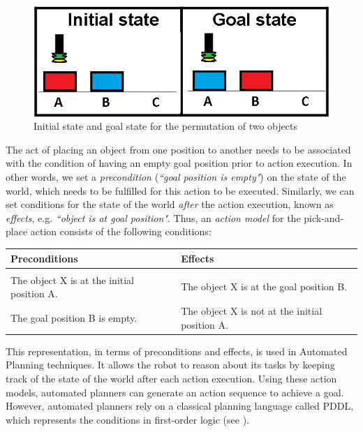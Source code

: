 \begin{figure}[h]
	\centering
	\includegraphics[scale=0.35]{figures/PbD-permutation}
	\caption{Initial state and goal state for the permutation of two objects}
	\label{fig:Permutation}
\end{figure}

The act of placing an object from one position to another needs to be associated with the condition of having an empty goal position prior to action execution.
In other words, we set a \textit{precondition} (\textit{``goal position is empty"}) on the state of the world, which needs to be fulfilled for this action to be executed.
Similarly, we can set conditions for the state of the world \textit{after} the action execution, known as \textit{effects}, e.g.
 \textit{``object is at goal position"}.
Thus, an \textit{action model} for the pick-and-place action consists of the following conditions:

\begin{table}[h]
	\begin{center}
		\begin{tabular}{l|l}
			Preconditions & Effects\\ \hline
			& \\
			The object X is at the initial position A.
			& The object X is at the goal position B.\\
			The goal position B is empty.
			& The object X is not at the initial position A.
		\end{tabular}
	\end{center}
	\label{tab:conditions}
\end{table}

This representation, in terms of preconditions and effects, is used in Automated Planning techniques.
It allows the robot to reason about its tasks by keeping track of the state of the world after each action execution.
Using these action models, automated planners can generate an action sequence to achieve a goal.
However, automated planners rely on a classical planning language called PDDL, which represents the conditions in first-order logic (see ).


